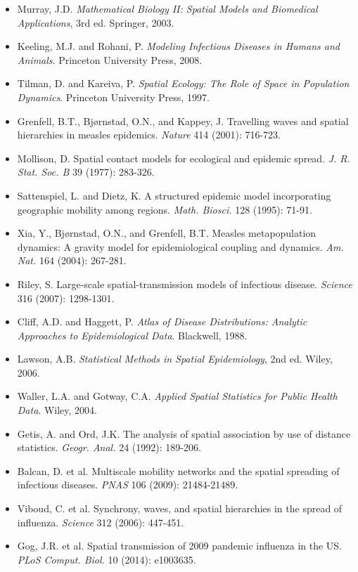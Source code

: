 \documentclass[a4paper, 11pt]{article}
\begin{document}
\begin{itemize}
\item Murray, J.D. \textit{Mathematical Biology II: Spatial Models and Biomedical Applications}, 3rd ed. Springer, 2003.
\item Keeling, M.J. and Rohani, P. \textit{Modeling Infectious Diseases in Humans and Animals}. Princeton University Press, 2008.
\item Tilman, D. and Kareiva, P. \textit{Spatial Ecology: The Role of Space in Population Dynamics}. Princeton University Press, 1997.
\item Grenfell, B.T., Bjørnstad, O.N., and Kappey, J. Travelling waves and spatial hierarchies in measles epidemics. \textit{Nature} 414 (2001): 716-723.
\item Mollison, D. Spatial contact models for ecological and epidemic spread. \textit{J. R. Stat. Soc. B} 39 (1977): 283-326.
\item Sattenspiel, L. and Dietz, K. A structured epidemic model incorporating geographic mobility among regions. \textit{Math. Biosci.} 128 (1995): 71-91.
\item Xia, Y., Bjørnstad, O.N., and Grenfell, B.T. Measles metapopulation dynamics: A gravity model for epidemiological coupling and dynamics. \textit{Am. Nat.} 164 (2004): 267-281.
\item Riley, S. Large-scale spatial-transmission models of infectious disease. \textit{Science} 316 (2007): 1298-1301.
\item Cliff, A.D. and Haggett, P. \textit{Atlas of Disease Distributions: Analytic Approaches to Epidemiological Data}. Blackwell, 1988.
\item Lawson, A.B. \textit{Statistical Methods in Spatial Epidemiology}, 2nd ed. Wiley, 2006.
\item Waller, L.A. and Gotway, C.A. \textit{Applied Spatial Statistics for Public Health Data}. Wiley, 2004.
\item Getis, A. and Ord, J.K. The analysis of spatial association by use of distance statistics. \textit{Geogr. Anal.} 24 (1992): 189-206.
\item Balcan, D. et al. Multiscale mobility networks and the spatial spreading of infectious diseases. \textit{PNAS} 106 (2009): 21484-21489.
\item Viboud, C. et al. Synchrony, waves, and spatial hierarchies in the spread of influenza. \textit{Science} 312 (2006): 447-451.
\item Gog, J.R. et al. Spatial transmission of 2009 pandemic influenza in the US. \textit{PLoS Comput. Biol.} 10 (2014): e1003635.

\end{itemize}
\end{document}
